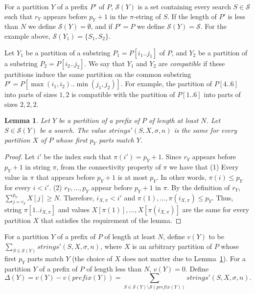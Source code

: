 \documentclass[12pt]{article}
\newtheorem{lemma}[theorem]{Lemma}
\newcommand{\substr}[3]{#1[#2..#3]}
\newcommand{\scheme}{\mathcal{S}}
\newcommand{\partition}{X}
\newcommand{\numstrings}{\mathit{strings}}
\newcommand{\numstringsp}{\numstrings'}
\newcommand{\lognc}{N}
\newcommand{\ppartition}{Y}
\newcommand{\pnumparts}[1]{p_{#1}}
\newcommand{\prank}[1]{r_{#1}}
\newcommand{\pprefix}[1]{\mathit{prefix}(#1)}
\begin{document}
For a partition $\ppartition$ of a prefix $P'$ of $P$,
$\scheme(\ppartition)$ is a set containing every search $S\in \scheme$
such that $\prank{\ppartition}$ appears before
$\pnumparts{\ppartition}+1$ in the $\pi$-string of $S$.
If the length of $P'$ is less than $\lognc$ we define 
$\scheme(\ppartition)=\emptyset$, and if $P' = P$ we define
$\scheme(\ppartition)=\scheme$.
For the example above, $\scheme(\ppartition_1) = \{S_1,S_2\}$.

Let $\ppartition_1$ be a partition of a substring
$P_1=\substr{P}{i_1}{j_1}$ of $P$,
and $\ppartition_2$ be a partition of a substring $P_2=\substr{P}{i_2}{j_2}$.
We say that $\ppartition_1$ and $\ppartition_2$ are \emph{compatible}
if these partitions induce the same partition on the common substring
$P'=\substr{P}{\max(i_1,i_2)}{\min(j_1,j_2)}$.
For example, the partition of $\substr{P}{4}{6}$ into parts of sizes $1,2$
is compatible with the partition of $\substr{P}{1}{6}$ into parts of sizes
$2,2,2$.

\begin{lemma}\label{lem:optimal-1}
Let $\ppartition$ be a partition of a prefix of $P$ of length at least $\lognc$.
Let $S\in \scheme(\ppartition)$ be a search.
The value $\numstringsp(S,\partition,\sigma,n)$ is the same for every
partition $\partition$ of $P$ whose first $\pnumparts{\ppartition}$ parts
match $\ppartition$.
\end{lemma}
\begin{proof}
Let $i'$ be the index such that $\pi(i')=\pnumparts{\ppartition}+1$.
Since $\prank{\ppartition}$ appears before
$\pnumparts{\ppartition}+1$ in string $\pi$,
from the connectivity property of $\pi$ we have that
(1) Every value in $\pi$ that appears before $\pnumparts{\ppartition}+1$
is at most $\pnumparts{\ppartition}$.
In other words, $\pi(i) \leq \pnumparts{\ppartition}$ for every $i < i'$.
(2) $\prank{\ppartition},\ldots,\pnumparts{\ppartition}$ appear before
$\pnumparts{\ppartition}+1$ in $\pi$.
By the definition of $\prank{\ppartition}$,
$\sum_{j=\prank{\ppartition}}^{\pnumparts{\ppartition}} X[j] \geq \lognc$.
Therefore, $i_{\partition,\pi} < i'$ and 
$\pi(1),\ldots,\pi(i_{\partition,\pi}) \leq \pnumparts{\ppartition}$.
Thus, string $\substr{\pi}{1}{i_{\partition,\pi}}$ and values
$\partition[\pi(1)],\ldots,\partition[\pi(i_{\partition,\pi})]$
are the same for every partition $\partition$ that satisfies the requirement of
the lemma.
\end{proof}

For a partition $\ppartition$ of a prefix of $P$ of length at least $\lognc$,
define $v(\ppartition)$ to be 
$\sum_{S\in \scheme(\ppartition)} \numstringsp(S,\partition,\sigma,n)$,
where $\partition$ is an arbitrary partition of $P$ whose first
$\pnumparts{\ppartition}$ parts match $\ppartition$
(the choice of $\partition$ does not matter due to Lemma~\ref{lem:optimal-1}).
For a partition $\ppartition$ of a prefix of $P$ of length less than $\lognc$,
$v(\ppartition) = 0$.
Define
\[\Delta(\ppartition) = v(\ppartition) - v(\pprefix{\ppartition})
= \sum_{S\in \scheme(\ppartition)\setminus\scheme(\pprefix{\ppartition})}
\numstringsp(S,\partition,\sigma,n).
\]
\end{document}
